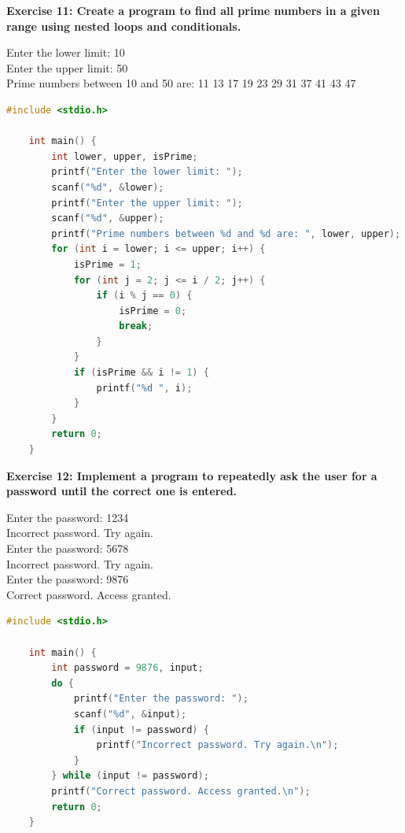 \documentclass[12pt, openany]{book}
\begin{document}
\noindent\textbf{Exercise 11: Create a program to find all prime numbers in a given range using nested loops and conditionals.}
\begin{tcolorbox}[colback=lightgray!10, colframe=black, title=Example Output]
    Enter the lower limit: 10 \\
    Enter the upper limit: 50 \\
    Prime numbers between 10 and 50 are: 11 13 17 19 23 29 31 37 41 43 47
\end{tcolorbox}

\begin{lstlisting}[language=C, gobble=0, caption=Solution to Exercise 11]
    #include <stdio.h>
    
    int main() {
        int lower, upper, isPrime;
        printf("Enter the lower limit: ");
        scanf("%d", &lower);
        printf("Enter the upper limit: ");
        scanf("%d", &upper);
        printf("Prime numbers between %d and %d are: ", lower, upper);
        for (int i = lower; i <= upper; i++) {
            isPrime = 1;
            for (int j = 2; j <= i / 2; j++) {
                if (i % j == 0) {
                    isPrime = 0;
                    break;
                }
            }
            if (isPrime && i != 1) {
                printf("%d ", i);
            }
        }
        return 0;
    }
\end{lstlisting}

\noindent\textbf{Exercise 12: Implement a program to repeatedly ask the user for a password until the correct one is entered.}
\begin{tcolorbox}[colback=lightgray!10, colframe=black, title=Example Output]
    Enter the password: 1234 \\
    Incorrect password. Try again. \\
    Enter the password: 5678 \\
    Incorrect password. Try again. \\
    Enter the password: 9876 \\
    Correct password. Access granted.
\end{tcolorbox}

\begin{lstlisting}[language=C, gobble=0, caption=Solution to Exercise 12]
    #include <stdio.h>
    
    int main() {
        int password = 9876, input;
        do {
            printf("Enter the password: ");
            scanf("%d", &input);
            if (input != password) {
                printf("Incorrect password. Try again.\n");
            }
        } while (input != password);
        printf("Correct password. Access granted.\n");
        return 0;
    }
\end{lstlisting}
\end{document}
